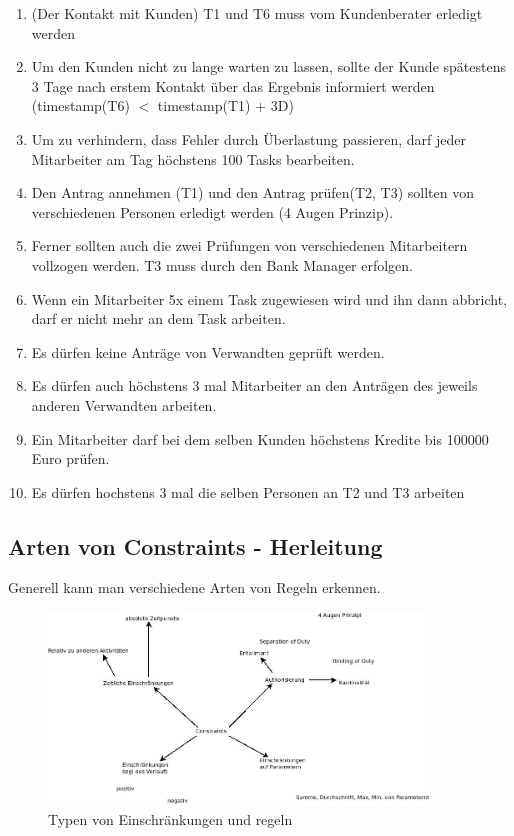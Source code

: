 \begin{enumerate}
\item (Der Kontakt mit Kunden) T1 und T6 muss vom Kundenberater erledigt werden
\item Um den Kunden nicht zu lange warten zu lassen, sollte der Kunde spätestens 3 Tage nach erstem Kontakt über das Ergebnis informiert werden (timestamp(T6) $<$ timestamp(T1) + 3D)
\item Um zu verhindern, dass Fehler durch Überlastung passieren, darf jeder Mitarbeiter am Tag höchstens 100 Tasks bearbeiten.
\item Den Antrag annehmen (T1) und den Antrag prüfen(T2, T3) sollten von verschiedenen Personen erledigt werden (4 Augen Prinzip).
\item Ferner sollten auch die zwei Prüfungen von verschiedenen Mitarbeitern vollzogen werden. T3 muss durch den Bank Manager erfolgen.
\item Wenn ein Mitarbeiter 5x einem Task zugewiesen wird und ihn dann abbricht, darf er nicht mehr an dem Task arbeiten.
\item Es dürfen keine Anträge von Verwandten geprüft werden.
\item Es dürfen auch höchstens 3 mal Mitarbeiter an den Anträgen des jeweils anderen Verwandten arbeiten.
\item Ein Mitarbeiter darf bei dem selben Kunden höchstens Kredite bis 100000 Euro prüfen.
\item Es dürfen hochstens 3 mal die selben Personen an T2 und T3 arbeiten
\end{enumerate}


%
%
\subsection{Arten von Constraints - Herleitung}
\label{sec:ArtenConstraints}

Generell kann man verschiedene Arten von Regeln erkennen.\\

\begin{figure}[ht]
	\centering
  \includegraphics[width=0.9\textwidth]{Figures/Constraints}
	\caption{Typen von Einschränkungen und regeln}
	\label{fig:constraints}
\end{figure}

